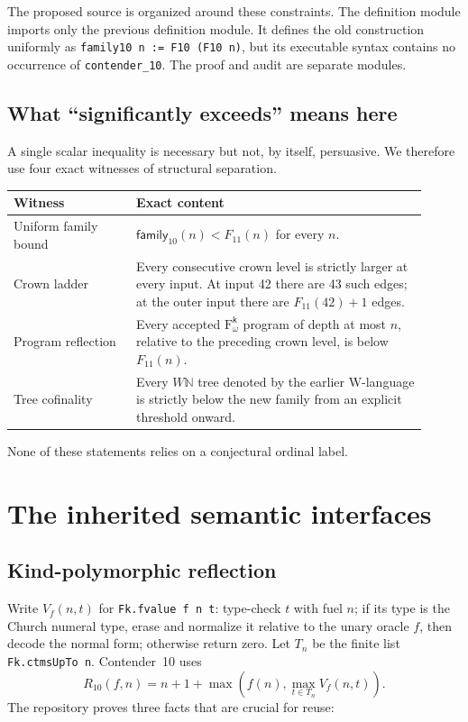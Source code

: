 \documentclass[11pt]{article}
\theoremstyle{definition}
\theoremstyle{remark}
\newcommand{\N}{\mathbb{N}}
\newcommand{\Fk}{\mathrm{F}_{\omega}^{\mathsf{k}}}
\newcommand{\code}[1]{\texttt{#1}}
\newcommand{\FamTen}{\mathsf{family}_{10}}
\newcommand{\Feleven}{F_{11}}
\begin{document}
The proposed source is organized around these constraints.  The definition
module imports only the previous definition module.  It defines the old
construction uniformly as \code{family10 n := F10 (F10 n)}, but its executable
syntax contains no occurrence of \code{contender\_10}.  The proof and audit are
separate modules.

\subsection{What ``significantly exceeds'' means here}

A single scalar inequality is necessary but not, by itself, persuasive.  We
therefore use four exact witnesses of structural separation.

\begin{center}
\begin{tabular}{p{0.27\linewidth}p{0.64\linewidth}}
\toprule
Witness & Exact content \\
\midrule
Uniform family bound & $\FamTen(n)<\Feleven(n)$ for every $n$. \\
Crown ladder & Every consecutive crown level is strictly larger at every
input.  At input 42 there are 43 such edges; at the outer input there are
$\Feleven(42)+1$ edges. \\
Program reflection & Every accepted $\Fk$ program of depth at most $n$,
relative to the preceding crown level, is below $\Feleven(n)$. \\
Tree cofinality & Every $W\N$ tree denoted by the earlier W-language is
strictly below the new family from an explicit threshold onward. \\
\bottomrule
\end{tabular}
\end{center}

None of these statements relies on a conjectural ordinal label.

\section{The inherited semantic interfaces}

\subsection{Kind-polymorphic reflection}

Write $V_f(n,t)$ for \code{Fk.fvalue f n t}: type-check $t$ with fuel $n$;
if its type is the Church numeral type, erase and normalize it relative to the
unary oracle $f$, then decode the normal form; otherwise return zero.  Let
$T_n$ be the finite list \code{Fk.ctmsUpTo n}.  Contender~10 uses
\[
  R_{10}(f,n)=n+1+
  \max\left(f(n),\max_{t\in T_n}V_f(n,t)\right).
\]
The repository proves three facts that are crucial for reuse:
\end{document}
